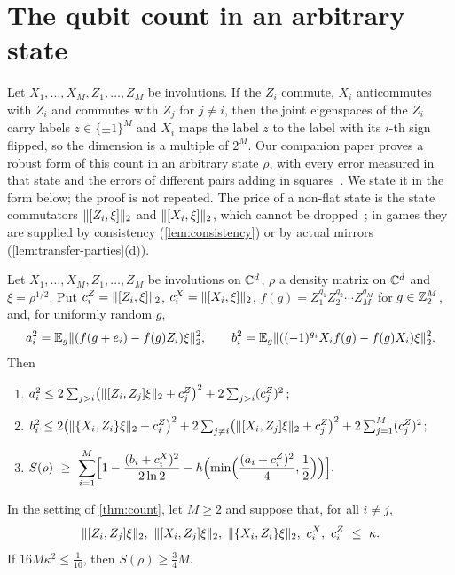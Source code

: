 \section{The qubit count in an arbitrary state}\label{sec:count}

Let $X_1,\dots,X_M,Z_1,\dots,Z_M$ be involutions. If the $Z_i$ commute, $X_i$ anticommutes with $Z_i$ and commutes with
$Z_j$ for $j\ne i$, then the joint eigenspaces of the $Z_i$ carry labels $z\in\{\pm1\}^M$ and $X_i$ maps the label $z$ to
the label with its $i$-th sign flipped, so the dimension is a multiple of $2^M$. Our companion paper proves a robust form of
this count in an arbitrary state $\rho$, with every error measured in that state and the errors of different pairs adding in
squares~\cite[Theorem~C, Theorem~4.1 and Corollary~4.2]{DM-game}. We state it in the form below; the proof is not
repeated. The price of a non-flat state is the state commutators $\lVert [Z_i,\xi]\rVert_2$ and
$\lVert [X_i,\xi]\rVert_2$, which cannot be dropped~\cite[Example~4.5]{DM-game}; in games they are supplied by consistency
(\cref{lem:consistency}) or by actual mirrors (\cref{lem:transfer-parties}(d)).

\begin{theorem}\label{thm:count}
Let $X_1,\dots,X_M,Z_1,\dots,Z_M$ be involutions on $\mathbb C^d$, $\rho$ a density matrix on $\mathbb C^d$ and $\xi=\rho^{1/2}$. Put
$c^Z_i=\lVert [Z_i,\xi]\rVert_2$, $c^X_i=\lVert [X_i,\xi]\rVert_2$, $f(g)=Z_1^{g_1}Z_2^{g_2}\cdots Z_M^{g_M}$ for $g\in\mathbb Z_2^M$, and, for
uniformly random $g$,
\[
a_i^2=\mathbb E_g\lVert (f(g+e_i)-f(g)Z_i)\xi\rVert_2^2,\qquad b_i^2=\mathbb E_g\lVert ((-1)^{g_i}X_if(g)-f(g)X_i)\xi\rVert_2^2 .
\]
Then
\begin{enumerate}[label=(\roman*),itemsep=2pt]
\item $a_i^2\le2\sum_{j>i}\bigl(\lVert [Z_i,Z_j]\xi\rVert_2+c^Z_j\bigr)^2+2\sum_{j>i}(c^Z_j)^2$;
\item $b_i^2\le2\bigl(\lVert \{X_i,Z_i\}\xi\rVert_2+c^Z_i\bigr)^2+2\sum_{j\ne i}\bigl(\lVert [X_i,Z_j]\xi\rVert_2+c^Z_j\bigr)^2+2\sum_{j=1}^M(c^Z_j)^2$;
\item $\displaystyle S(\rho)\ \ge\ \sum_{i=1}^M\Bigl[1-\frac{(b_i+c^X_i)^2}{2\ln2}-h\Bigl(\min\Bigl(\frac{(a_i+c^Z_i)^2}4,\frac12\Bigr)\Bigr)\Bigr].$
\end{enumerate}
\end{theorem}

\begin{corollary}\label{cor:count-uniform}
In the setting of \cref{thm:count}, let $M\ge2$ and suppose that, for all $i\ne j$,
\[
\hs{[Z_i,Z_j]\xi},\ \hs{[X_i,Z_j]\xi},\ \hs{\{X_i,Z_i\}\xi},\ c^X_i,\ c^Z_i\ \le\ \kappa .
\]
If $16M\kappa^2\le\frac1{10}$, then $S(\rho)\ge\frac34M$.
\end{corollary}

